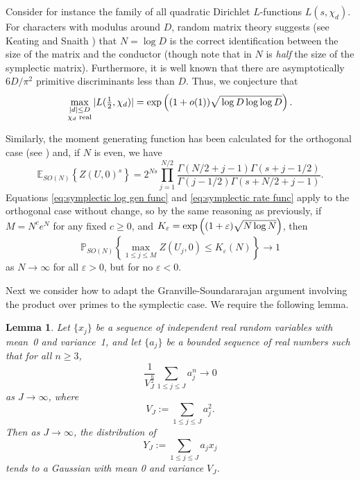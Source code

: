 \documentclass[10pt,reqno,twoside]{amsart}
\newcommand{\E}{\mathbb{E}}
\newcommand{\Prob}{\mathbb{P}}
\newtheorem{lemma}[theorem]{Lemma}
\numberwithin{equation}{section}
\numberwithin{theorem}{section}
\begin{document}
{{Consider for instance the family of all quadratic Dirichlet
$L$-functions $L(s,\chi_d)$. For characters with modulus around
$D$, random matrix theory suggests (see Keating and Snaith \cite{KS2})
that $N = \log D$ is the correct identification between the size of the
matrix and the conductor (though note that in \cite{KS2} $N$ is \emph{half}
the size of the symplectic matrix). Furthermore, it is well known that there
are asymptotically $6 D / \pi^2$ primitive discriminants less than $D$.
Thus, we conjecture that
\begin{equation}
\max_{\substack{|d| \leq D \\ \chi_d \text{ real}}}
|L(\tfrac12,\chi_d)| = \exp\left(  (1+o(1)) \sqrt{\mathstrut \log
D \log\log D}\right) .
\end{equation}

Similarly,  the moment generating function
has been calculated for the orthogonal case (see \cite{KS2})
and, if $N$ is even, we have
\begin{equation}
\E_{SO(N)}\left\{Z(U,0)^s \right\} = 2^{Ns} \prod_{j=1}^{N/2}
\frac{\Gamma(N/2+j-1) \Gamma(s+j-1/2)}{\Gamma(j-1/2)
\Gamma(s+N/2+j-1)}.
\end{equation}
Equations \eqref{eq:symplectic log gen func} and
\eqref{eq:symplectic rate func} apply to the orthogonal case
without change, so by the same reasoning as previously, if $M=N^c
e^{N}$ for any fixed $c\geq 0$, and
$K_\varepsilon=\exp\left((1+\varepsilon)\sqrt{\mathstrut N \log N}\right)$, then
\begin{equation}
\Prob_{SO(N)}\left\{ \max_{1\leq j \leq M} Z(U_j,0) \leq
K_\varepsilon(N) \right\} \to 1
\end{equation}
as $N\to\infty$ for all $\varepsilon>0$, but for no
$\varepsilon<0$.

Next we consider how to adapt the Granville-Soundararajan argument
involving the product over primes
to the symplectic case. We require the following lemma.
\begin{lemma}
Let $\{x_j\}$ be a sequence of independent \emph{real} random variables
with mean~0 and variance~1, and let $\{a_j\}$ be a bounded sequence
of real numbers such that for all $n \ge 3$,
\begin{equation}
\frac{1}{V_J^{\frac{n}{2}}} \sum_{1\le j\le J} a_j^n\to 0
\end{equation}
as $J\to\infty$, where
\begin{equation}
V_J:= \sum_{1\le j\le J} a_j^2 .
\end{equation}
Then as $J\to\infty$, the distribution of
\begin{equation}
Y_J:= \sum_{1\le j\le J} a_j x_j
\end{equation}
tends to a Gaussian with mean 0 and variance $V_J$.
\end{lemma}

}}
\end{document}
